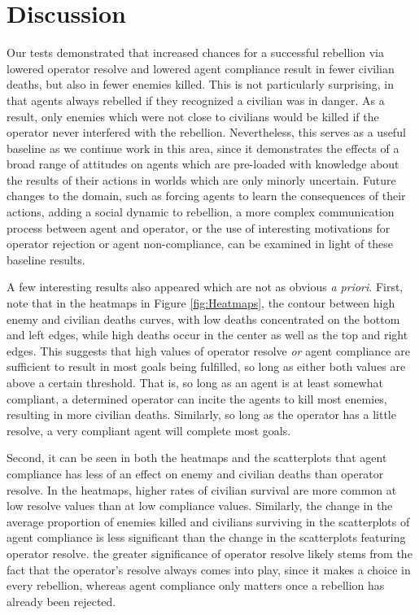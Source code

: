 \documentclass[letterpaper,11pt]{article}
\begin{document}
	\section{Discussion}
	Our tests demonstrated that increased chances for a successful rebellion via lowered operator resolve and lowered agent compliance result in fewer civilian deaths, but also in fewer enemies killed. This is not particularly surprising, in that agents always rebelled if they recognized a civilian was in danger. As a result, only enemies which were not close to civilians would be killed if the operator never interfered with the rebellion. Nevertheless, this serves as a useful baseline as we continue work in this area, since it demonstrates the effects of a broad range of attitudes on agents which are pre-loaded with knowledge about the results of their actions in worlds which are only minorly uncertain. Future changes to the domain, such as forcing agents to learn the consequences of their actions, adding a social dynamic to rebellion, a more complex communication process between agent and operator, or the use of interesting motivations for operator rejection or agent non-compliance, can be examined in light of these baseline results. \par
	
	A few interesting results also appeared which are not as obvious \textit{a priori}. First, note that in the heatmaps in Figure \ref{fig:Heatmaps}, the contour between high enemy and civilian deaths curves, with low deaths concentrated on the bottom and left edges, while high deaths occur in the center as well as the top and right edges. This suggests that high values of operator resolve \textit{or} agent compliance are sufficient to result in most goals being fulfilled, so long as either both values are above a certain threshold. That is, so long as an agent is at least somewhat compliant, a determined operator can incite the agents to kill most enemies, resulting in more civilian deaths. Similarly, so long as the operator has a little resolve, a very compliant agent will complete most goals. \par

	Second, it can be seen in both the heatmaps and the scatterplots that agent compliance has less of an effect on enemy and civilian deaths than operator resolve. In the heatmaps, higher rates of civilian survival are more common at low resolve values than at low compliance values. Similarly, the change in the average proportion of enemies killed and civilians surviving in the scatterplots of agent compliance is less significant than the change in the scatterplots featuring operator resolve. the greater significance of operator resolve likely stems from the fact that the operator's resolve always comes into play, since it makes a choice in every rebellion, whereas agent compliance only matters once a rebellion has already been rejected. \par
	
\end{document}
